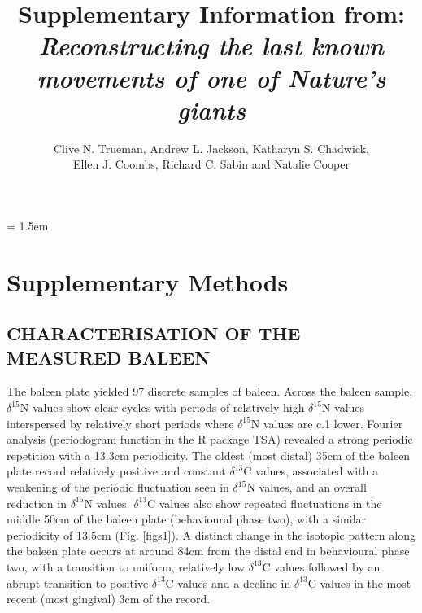 \documentclass[a4paper,12pt]{article}
\title{Supplementary Information from:\\
\textit{Reconstructing the last known movements of one of Nature's giants}}
\author{Clive N. Trueman, Andrew L. Jackson, Katharyn S. Chadwick,\\ 
Ellen J. Coombs, Richard C. Sabin and Natalie Cooper}
\date{}
\begin{document}

\maketitle

\parindent = 1.5em
\addtolength{\parskip}{.3em}


\section*{Supplementary Methods}
 
\subsection*{CHARACTERISATION OF THE MEASURED BALEEN}
The baleen plate yielded 97 discrete samples of baleen. 
Across the baleen sample, $\delta^{15}$N values show clear cycles with periods of relatively high $\delta^{15}$N values interspersed by relatively short periods where $\delta^{15}$N values are c.1\text{\textperthousand} lower. 
Fourier analysis (periodogram function in the R package TSA\cite{Chan:2012aa}) revealed a strong periodic repetition with a 13.3cm periodicity. 
The oldest (most distal) 35cm of the baleen plate  record relatively positive and constant $\delta^{13}$C values, associated with a weakening of the periodic fluctuation seen in $\delta^{15}$N values, and an overall reduction in $\delta^{15}$N values. 
$\delta^{13}$C values also show repeated fluctuations in the middle 50cm of the baleen plate (behavioural phase two), with a similar periodicity of 13.5cm (Fig. \ref{figs1}). 
A distinct change in the isotopic pattern along the baleen plate occurs at around 84cm from the distal end in behavioural phase two, with a transition to uniform, relatively low $\delta^{13}$C values followed by an abrupt transition to positive $\delta^{13}$C values and a decline in $\delta^{13}$C values in the most recent (most gingival) 3cm of the record.
\end{document}
